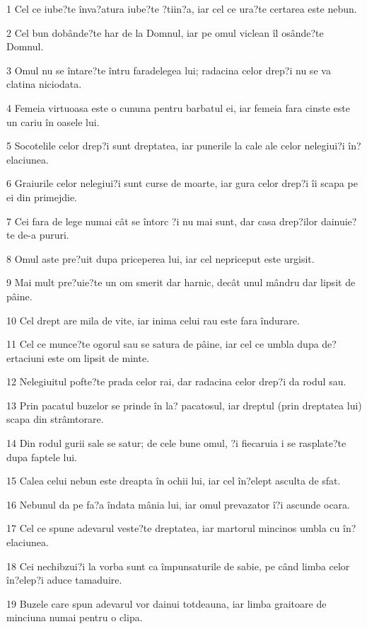 \par 1 Cel ce iube?te înva?atura iube?te ?tiin?a, iar cel ce ura?te certarea este nebun.
\par 2 Cel bun dobânde?te har de la Domnul, iar pe omul viclean îl osânde?te Domnul.
\par 3 Omul nu se întare?te întru faradelegea lui; radacina celor drep?i nu se va clatina niciodata.
\par 4 Femeia virtuoasa este o cununa pentru barbatul ei, iar femeia fara cinste este un cariu în oasele lui.
\par 5 Socotelile celor drep?i sunt dreptatea, iar punerile la cale ale celor nelegiui?i în?elaciunea.
\par 6 Graiurile celor nelegiui?i sunt curse de moarte, iar gura celor drep?i îi scapa pe ei din primejdie.
\par 7 Cei fara de lege numai cât se întorc ?i nu mai sunt, dar casa drep?ilor dainuie?te de-a pururi.
\par 8 Omul aste pre?uit dupa priceperea lui, iar cel nepriceput este urgisit.
\par 9 Mai mult pre?uie?te un om smerit dar harnic, decât unul mândru dar lipsit de pâine.
\par 10 Cel drept are mila de vite, iar inima celui rau este fara îndurare.
\par 11 Cel ce munce?te ogorul sau se satura de pâine, iar cel ce umbla dupa de?ertaciuni este om lipsit de minte.
\par 12 Nelegiuitul pofte?te prada celor rai, dar radacina celor drep?i da rodul sau.
\par 13 Prin pacatul buzelor se prinde în la? pacatosul, iar dreptul (prin dreptatea lui) scapa din strâmtorare.
\par 14 Din rodul gurii sale se satur; de cele bune omul, ?i fiecaruia i se rasplate?te dupa faptele lui.
\par 15 Calea celui nebun este dreapta în ochii lui, iar cel în?elept asculta de sfat.
\par 16 Nebunul da pe fa?a îndata mânia lui, iar omul prevazator î?i ascunde ocara.
\par 17 Cel ce spune adevarul veste?te dreptatea, iar martorul mincinos umbla cu în?elaciunea.
\par 18 Cei nechibzui?i la vorba sunt ca împunsaturile de sabie, pe când limba celor în?elep?i aduce tamaduire.
\par 19 Buzele care spun adevarul vor dainui totdeauna, iar limba graitoare de minciuna numai pentru o clipa.
